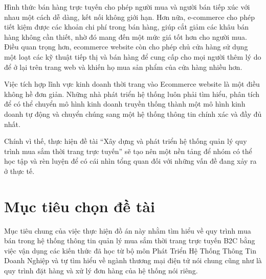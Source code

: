 \documentclass[12pt,a4paper,2sides]{report}
\begin{document}
Hình thức bán hàng trực tuyến cho phép người mua và người bán tiếp xúc với nhau một cách dễ dàng, kết nối không giới hạn. Hơn nữa, e-commerce cho phép tiết kiệm được các khoản chi phí trong bán hàng, giúp cắt giảm các khâu bán hàng không cần thiết, nhờ đó mang đến một mức giá tốt hơn cho người mua. Điều quan trọng hơn, ecommerce website còn cho phép chủ cửa hàng sử dụng một loạt các kỹ thuật tiếp thị và bán hàng để cung cấp cho mọi người thêm lý do để ở lại trên trang web và khiến họ mua sản phẩm của cửa hàng nhiều hơn.

Việc tích hợp lĩnh vực kinh doanh thời trang vào Ecommerce website là một điều không hề đơn giản. Những nhà phát triển hệ thống luôn phải tìm hiểu, phân tích để có thể chuyển mô hình kinh doanh truyền thống thành một mô hình kinh doanh tự động và chuyển chúng sang một hệ thống thông tin chính xác và đầy đủ nhất.

Chính vì thế, thực hiện đề tài “Xây dựng và phát triển hệ thống quản lý quy trình mua sắm thời trang trực tuyến” sẽ tạo nên một nền tảng để nhóm có thể học tập và rèn luyện để có cái nhìn tổng quan đối với những vấn đề đang xảy ra ở thực tế.
\section{Mục tiêu chọn đề tài} 
Mục tiêu chung của việc thực hiện đồ án này nhằm tìm hiểu về quy trình mua bán trong hệ thống thông tin quản lý mua sắm thời trang trực tuyến B2C bằng việc vận dụng các kiến thức đã học từ bộ môn Phát Triển Hệ Thống Thông Tin Doanh Nghiệp và tự tìm hiểu về ngành thương mại điện tử nói chung cũng như là quy trình đặt hàng và xử lý đơn hàng của hệ thống nói riêng.
\end{document}
